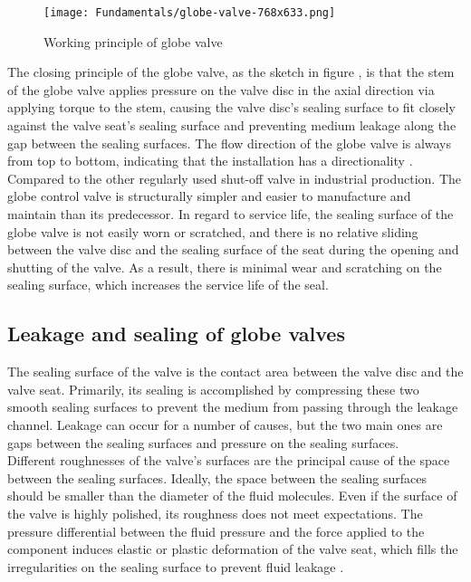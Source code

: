 \begin{figure}[htbp]
    \centering
    \texttt{[image: Fundamentals/globe-valve-768x633.png]}
    \caption{Working principle of globe valve \cite{WPfigure}}
    \label{fig:WP}
\end{figure}

The closing principle of the globe valve, as the sketch in figure , is that the stem of the globe valve applies pressure on the 
valve disc in the axial direction via applying torque to the stem, causing the valve disc's sealing 
surface to fit closely against the valve seat's sealing surface and preventing medium leakage along 
the gap between the sealing surfaces. The flow direction of the globe valve is always from top to bottom, 
indicating that the installation has a directionality \cite{WP}.\\

Compared to the other regularly used shut-off valve in industrial production. 
The globe control valve is structurally simpler and easier to manufacture and maintain than its predecessor. 
In regard to service life, the sealing surface of the globe valve is not easily worn or scratched, 
and there is no relative sliding between the valve disc and the sealing surface of the seat during 
the opening and shutting of the valve. As a result, there is minimal wear and scratching on the sealing surface, 
which increases the service life of the seal.


\subsection{Leakage and sealing of globe valves}
\label{sec:LeakageandSealingofglobevalves}

The sealing surface of the valve is the contact area between the valve disc and the valve seat. 
Primarily, its sealing is accomplished by compressing these two smooth sealing surfaces to prevent 
the medium from passing through the leakage channel. Leakage can occur for a number of causes, 
but the two main ones are gaps between the sealing surfaces and pressure on the sealing surfaces.\\

Different roughnesses of the valve's surfaces are the principal cause of the space between the sealing surfaces. 
Ideally, the space between the sealing surfaces should be smaller than the diameter of the fluid molecules. 
Even if the surface of the valve is highly polished, its roughness does not meet expectations. 
The pressure differential between the fluid pressure and the force applied to the component induces elastic or plastic 
deformation of the valve seat, which fills the irregularities on the sealing surface to prevent fluid leakage \cite{LeckagenPrinciple}.\\

